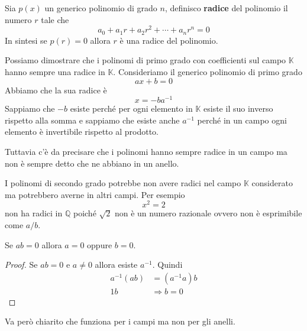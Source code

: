 \begin{definition}
	Sia $p(x)$ un generico polinomio di grado $n$, definisco \textbf{radice} del polinomio
	il numero $r$ tale che
	\begin{equation*}
		a_0 + a_1 r + a_2 r^2 + \cdots + a_n r^n = 0
	\end{equation*}
	In sintesi se $p(r) = 0$ allora $r$ \`e una radice del polinomio.
\end{definition}

\begin{observation}
	Possiamo dimostrare che i polinomi di primo grado con coefficienti sul campo $\mathbb{K}$
	hanno sempre una radice in $\mathbb{K}$. Consideriamo il generico polinomio di primo grado
	\begin{equation*}
		ax + b = 0
	\end{equation*}
	Abbiamo che la sua radice \`e
	\begin{equation*}
		x = -b a^{-1}
	\end{equation*}
	Sappiamo che $-b$ esiste perch\'e per ogni elemento in $\mathbb{K}$ esiste il suo inverso
	rispetto alla somma e sappiamo che esiste anche $a^{-1}$ perch\'e in un campo ogni elemento
	\`e invertibile rispetto al prodotto.

	Tuttavia c'\`e da precisare che i polinomi hanno sempre radice in un campo ma non \`e
	sempre detto che ne abbiano in un anello.
\end{observation}

\begin{observation}
	I polinomi di secondo grado potrebbe non avere radici nel campo $\mathbb{K}$ considerato
	ma potrebbero averne in altri campi.
	Per esempio
	\begin{equation*}
		x^2 = 2
	\end{equation*}
	non ha radici in $\mathbb{Q}$ poich\'e $\sqrt{2}$ non \`e un numero razionale ovvero non
	\`e esprimibile come $a / b$.
\end{observation}

\begin{theorem}
	Se $ab = 0$ allora $a = 0$ oppure $b = 0$.
	\begin{proof}
		Se $ab = 0$ e $a \neq 0$ allora esiste $a^{-1}$. Quindi
		\begin{equation*}
			\begin{array}{ll}
				a^{-1}(ab) & = (a^{-1}a)b      \\
				1b         & \Rightarrow b = 0
			\end{array}
		\end{equation*}
	\end{proof}
	Va per\`o chiarito che funziona per i campi ma non per gli anelli.
\end{theorem}

